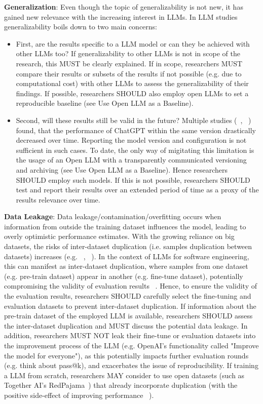 \textbf{Generalization}:
Even though the topic of generalizability is not new, it has gained new relevance with the increasing interest in LLMs. In LLM studies generalizability boils down to two main concerns: 
\begin{itemize}
  \item First, are the results specific to a LLM model or can they be achieved with other LLMs too? If generalizability to other LLMs is not in scope of the research, this MUST be clearly explained. If in scope, researchers MUST compare their results or subsets of the results if not possible (e.g. due to computational cost) with other LLMs to assess the generalizability of their findings. If possible, researchers SHOULD also employ open LLMs to set a reproducible baseline (see Use Open LLM as a Baseline).
  \item Second, will these results still be valid in the future? Multiple studies (~\cite{DBLP:journals/corr/abs-2307-09009}, ~\cite{doi:10.1148/radiol.232411}) found, that the performance of ChatGPT within the same version drastically decreased over time. Reporting the model version and configuration is not sufficient in such cases. To date, the only way of migitating this limitation is the usage of an Open LLM with a transparently communicated versioning and archiving (see Use Open LLM as a Baseline). Hence researchers SHOULD employ such models. If this is not possible, researchers SHOULD test and report their results over an extended period of time as a proxy of the results relevance over time.
\end{itemize}

\textbf{Data Leakage}:
Data leakage/contamination/overfitting occurs when information from outside the training dataset influences the model, leading to overly optimistic performance estimates. With the growing reliance on big datasets, the risks of inter-dataset duplication (i.e. samples duplication between datasets) increases (e.g. ~\cite{10.1145/3133908}, ~\cite{10.1145/3359591.3359735}). 
In the context of LLMs for software engineering, this can manifest as inter-dataset duplication, where samples from one dataset (e.g. pre-train dataset) appear in another (e.g. fine-tune dataset), potentially compromising the validity of evaluation results ~\cite{inter-dataset-lopez2025}. 
Hence, to ensure the validity of the evaluation results, researchers SHOULD carefully select the fine-tuning and evaluation datasets to prevent inter-dataset duplication. If information about the pre-train dataset of the employed LLM is available, researchers SHOULD assess the inter-dataset duplication and MUST discuss the potential data leakage.
In addition, researchers MUST NOT leak their fine-tune or evaluation datasets into the improvement process of the LLM (e.g. OpenAI's functionality called "Improve the model for everyone"), as this potentially impacts further evaluation rounds (e.g. think about pass@k), and exacerbates the issue of reproducibility.
If training a LLM from scratch, researchers MAY consider to use open datasets (such as Together AI's RedPajama~\cite{together2023redpajama}) that already incorporate duplication (with the positive side-effect of improving performance ~\cite{lee-etal-2022-deduplicating}).

